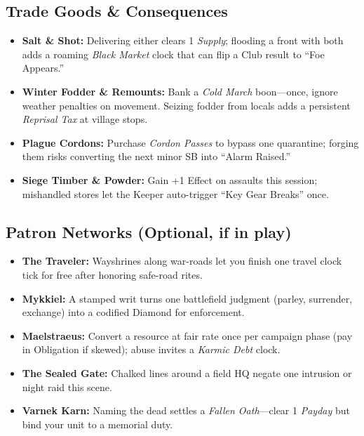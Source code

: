 \subsection*{Trade Goods \& Consequences}
\begin{itemize}
  \item \textbf{Salt \& Shot:} Delivering either clears 1 \emph{Supply}; flooding a front with both adds a roaming \emph{Black Market} clock that can flip a Club result to “Foe Appears.”
  \item \textbf{Winter Fodder \& Remounts:} Bank a \emph{Cold March} boon—once, ignore weather penalties on movement. Seizing fodder from locals adds a persistent \emph{Reprisal Tax} at village stops.
  \item \textbf{Plague Cordons:} Purchase \emph{Cordon Passes} to bypass one quarantine; forging them risks converting the next minor SB into “Alarm Raised.”
  \item \textbf{Siege Timber \& Powder:} Gain +1 Effect on assaults this session; mishandled stores let the Keeper auto-trigger “Key Gear Breaks” once.
\end{itemize}

\subsection*{Patron Networks (Optional, if in play)}
\begin{itemize}
  \item \textbf{The Traveler:} Wayshrines along war-roads let you finish one travel clock tick for free after honoring safe-road rites.
  \item \textbf{Mykkiel:} A stamped writ turns one battlefield judgment (parley, surrender, exchange) into a codified Diamond for enforcement.
  \item \textbf{Maelstraeus:} Convert a resource at fair rate once per campaign phase (pay in Obligation if skewed); abuse invites a \emph{Karmic Debt} clock.
  \item \textbf{The Sealed Gate:} Chalked lines around a field HQ negate one intrusion or night raid this scene.
  \item \textbf{Varnek Karn:} Naming the dead settles a \emph{Fallen Oath}—clear 1 \emph{Payday} but bind your unit to a memorial duty.
\end{itemize}

